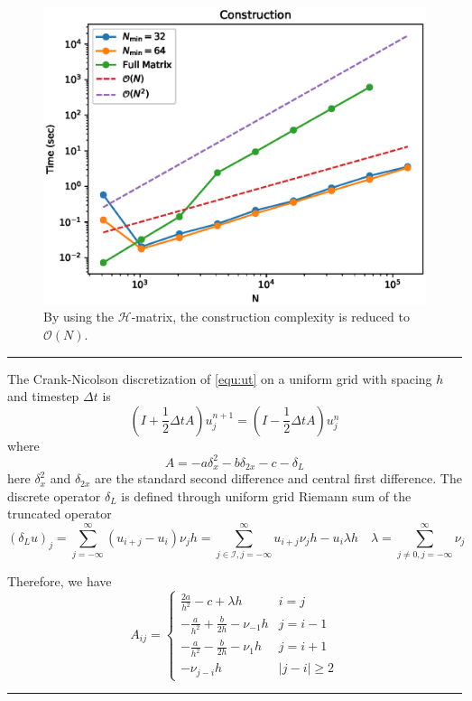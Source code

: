 \documentclass[10pt,a4paper]{article}
\theoremstyle{definition}
\begin{document}
\begin{figure}[htpb]
\centering
\includegraphics[scale=0.6]{figures/construction.eps}
\caption{By using the $\mathcal{H}$-matrix, the construction complexity is reduced to $\mathcal{O}(N)$.}
\label{fig:construction}
\end{figure}

\hrule


The Crank-Nicolson discretization of \cref{equ:ut} on a uniform grid with spacing $h$ and timestep $\Delta t$ is 
\begin{equation}
	(I+\frac{1}{2}\Delta tA)u_j^{n+1} = (I-\frac{1}{2}\Delta tA)u_j^n
\end{equation}
where 
\begin{equation}
	A = -a\delta_x^2 - b\delta_{2x} - c - \delta_L
\end{equation}
here $\delta_x^2$ and $\delta_{2x}$ are the standard second difference and central first difference. The discrete operator $\delta_L$ is defined through uniform grid Riemann sum of the truncated operator
\begin{equation}\label{equ:dl}
	(\delta_L u)_j = \sum_{j=-\infty}^\infty (u_{i+j}-u_i)\nu_j h =  \sum_{j\in \mathcal{I}, j=-\infty}^\infty u_{i+j}\nu_j h - u_i \lambda h\quad \lambda = \sum_{j\neq 0, j=-\infty}^\infty \nu_j
\end{equation}

Therefore, we have
\begin{equation}\label{equ:Aij}
  {A_{ij}} = 
  \begin{cases}
  	{\frac{{2a}}{{{h^2}}} - c + \lambda h} & i=j\\
{ - \frac{a}{{{h^2}}} + \frac{b}{{2h}} - {\nu _{ - 1}h}} & j=i-1\\
{ - \frac{a}{{{h^2}}} - \frac{b}{{2h}} - {\nu _1}h} & j=i+1\\
{ - {\nu _{j - i}h}} & |j-i|\geq 2
  \end{cases}
\end{equation}
\hrule
\end{document}

